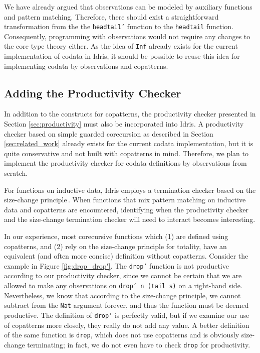 We have already argued that observations can be modeled by auxiliary functions and pattern matching. Therefore, there should exist a straightforward transformation from the the \texttt{headtail'} function to the \texttt{headtail} function. Consequently, programming with observations would not require any changes to the core type theory either. As the idea of \texttt{Inf} already exists for the current implementation of codata in Idris, it should be possible to reuse this idea for implementing codata by observations and copatterns.

\subsection{Adding the Productivity Checker}
\label{sec:copattern_in_idris_productivity_checker}



In addition to the constructs for copatterns, the productivity checker presented in Section \ref{sec:productivity} must also be incorporated into Idris. A productivity checker based on simple guarded corecursion as described in Section \ref{sec:related_work} already exists for the current codata implementation, but it is quite conservative and not built with copatterns in mind. Therefore, we plan to implement the productivity checker for codata definitions by observations from scratch.

For functions on inductive data, Idris employs a termination checker based on the size-change principle\,\citep{LeeJones01SizeChange}. When functions that mix pattern matching on inductive data and copatterns are encountered, identifying when the productivity checker and the size-change termination checker will need to interact becomes interesting.

In our experience, most corecursive functions which (1) are defined using copatterns, and (2) rely on the size-change principle for totality, have an equivalent (and often more concise) definition without copatterns. Consider the example in Figure \ref{fig:drop_drop'}. The \texttt{drop'} function is not productive according to our productivity checker, since we cannot be certain that we are allowed to make any observations on \texttt{drop' n (tail s)} on a right-hand side. Nevertheless, we know that according to the size-change principle, we cannot subtract from the \texttt{Nat} argument forever, and thus the function must be deemed productive. The definition of \texttt{drop'} is perfectly valid, but if we examine our use of copatterns more closely, they really do not add any value. A better definition of the same function is \texttt{drop}, which does not use copatterns and is obviously size-change terminating; in fact, we do not even have to check \texttt{drop} for productivity. 

